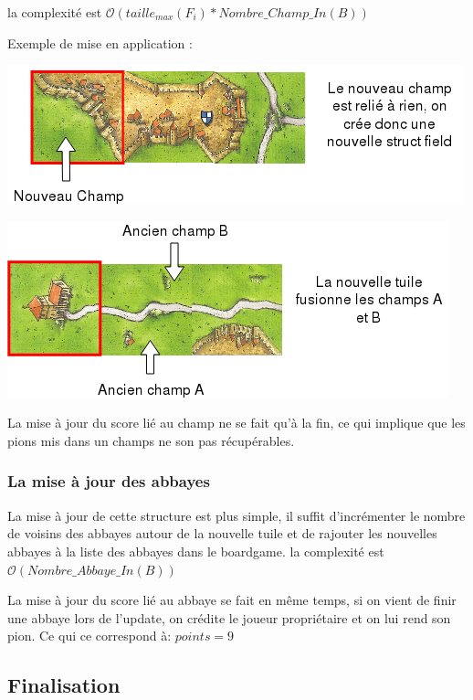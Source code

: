 la complexité est $\mathcal{O}(taille_{max}(F_i) * Nombre\_Champ\_In(B))$


\vspace{0.5cm}
Exemple de mise en application :

\includegraphics[scale=1]{champModif1.png}

\vspace{1cm}

\includegraphics[scale=1]{champModif2.png}

\vspace{1cm}

La mise à jour du score lié au champ ne se fait qu'à la fin, ce qui implique que les pions mis dans un champs ne son pas récupérables.

\subsubsection{La mise à jour des abbayes}

La mise à jour de cette structure est plus simple, il suffit d'incrémenter le nombre de voisins des abbayes autour de la nouvelle tuile et de rajouter les nouvelles abbayes à la liste des abbayes dans le boardgame. 
la complexité est $\mathcal{O}(Nombre\_Abbaye\_In(B))$

La mise à jour du score lié au abbaye se fait en même temps, si on vient de finir une abbaye lors de l'update, on crédite le joueur propriétaire et on lui rend son pion.
Ce qui ce correspond à: $points = 9$

\subsection{Finalisation}

